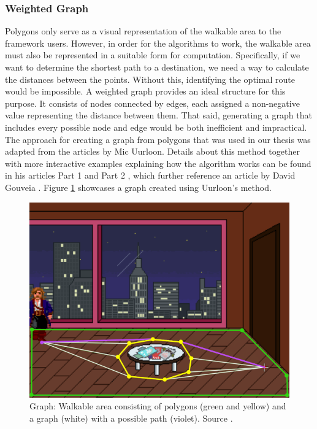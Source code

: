 \subsubsection{Weighted Graph}
Polygons only serve as a visual representation of the walkable area to the framework users. However, in order for the algorithms to work, the walkable area must also be represented in a suitable form for computation. Specifically, if we want to determine the shortest path to a destination, we need a way to calculate the distances between the points. Without this, identifying the optimal route would be impossible. A weighted graph provides an ideal structure for this purpose. It consists of nodes connected by edges, each assigned a non-negative value representing the distance between them. That said, generating a graph that includes every possible node and edge would be both inefficient and impractical. The approach for creating a graph from polygons that was used in our thesis was adapted from the articles by Mic Uurloon. Details about this method together with more interactive examples explaining how the algorithm works can be found in his articles Part 1 \cite{Uurloon1} and Part 2 \cite{Uurloon2}, which further reference an article by David Gouveia \cite{Gouveia}.
Figure \ref{fig:Graph}
showcases a graph created using Uurloon's method.
\begin{figure}[H]
\centering
\includegraphics[width=.7\linewidth]{img/WS-polygons3.png}
\caption{Graph: Walkable area consisting of polygons (green and yellow) and a graph (white) with a possible path (violet). Source \cite{Uurloon1}.}
\label{fig:Graph}
\end{figure}

